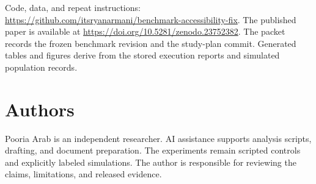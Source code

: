 \documentclass{article}
\begin{document}
Code, data, and repeat instructions: \url{https://github.com/itsryanarmani/benchmark-accessibility-fix}. The published paper is available at \url{https://doi.org/10.5281/zenodo.23752382}. The packet records the frozen benchmark revision and the study-plan commit. Generated tables and figures derive from the stored execution reports and simulated population records.


\section{Authors}
Pooria Arab is an independent researcher. AI assistance supports analysis scripts, drafting, and document preparation. The experiments remain scripted controls and explicitly labeled simulations. The author is responsible for reviewing the claims, limitations, and released evidence.



\end{document}
